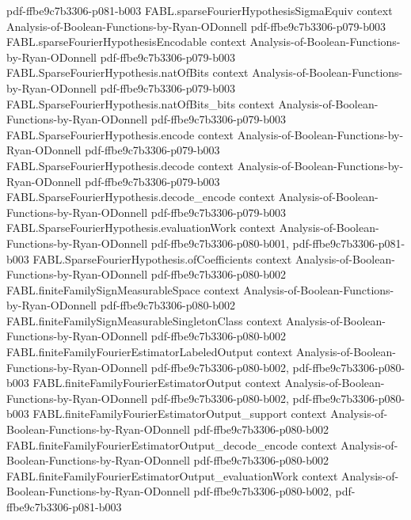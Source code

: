 \begin{theorem}
{    pdf-ffbe9c7b3306-p081-b003}
\proofstep
  {FABL.sparseFourierHypothesisSigmaEquiv}
  {context}
  {Analysis-of-Boolean-Functions-by-Ryan-ODonnell}
  {pdf-ffbe9c7b3306-p079-b003}
\proofstep
  {FABL.sparseFourierHypothesisEncodable}
  {context}
  {Analysis-of-Boolean-Functions-by-Ryan-ODonnell}
  {pdf-ffbe9c7b3306-p079-b003}
\proofstep
  {FABL.SparseFourierHypothesis.natOfBits}
  {context}
  {Analysis-of-Boolean-Functions-by-Ryan-ODonnell}
  {pdf-ffbe9c7b3306-p079-b003}
\proofstep
  {FABL.SparseFourierHypothesis.natOfBits_bits}
  {context}
  {Analysis-of-Boolean-Functions-by-Ryan-ODonnell}
  {pdf-ffbe9c7b3306-p079-b003}
\proofstep
  {FABL.SparseFourierHypothesis.encode}
  {context}
  {Analysis-of-Boolean-Functions-by-Ryan-ODonnell}
  {pdf-ffbe9c7b3306-p079-b003}
\proofstep
  {FABL.SparseFourierHypothesis.decode}
  {context}
  {Analysis-of-Boolean-Functions-by-Ryan-ODonnell}
  {pdf-ffbe9c7b3306-p079-b003}
\proofstep
  {FABL.SparseFourierHypothesis.decode_encode}
  {context}
  {Analysis-of-Boolean-Functions-by-Ryan-ODonnell}
  {pdf-ffbe9c7b3306-p079-b003}
\proofstep
  {FABL.SparseFourierHypothesis.evaluationWork}
  {context}
  {Analysis-of-Boolean-Functions-by-Ryan-ODonnell}
  {pdf-ffbe9c7b3306-p080-b001,
    pdf-ffbe9c7b3306-p081-b003}
\proofstep
  {FABL.SparseFourierHypothesis.ofCoefficients}
  {context}
  {Analysis-of-Boolean-Functions-by-Ryan-ODonnell}
  {pdf-ffbe9c7b3306-p080-b002}
\proofstep
  {FABL.finiteFamilySignMeasurableSpace}
  {context}
  {Analysis-of-Boolean-Functions-by-Ryan-ODonnell}
  {pdf-ffbe9c7b3306-p080-b002}
\proofstep
  {FABL.finiteFamilySignMeasurableSingletonClass}
  {context}
  {Analysis-of-Boolean-Functions-by-Ryan-ODonnell}
  {pdf-ffbe9c7b3306-p080-b002}
\proofstep
  {FABL.finiteFamilyFourierEstimatorLabeledOutput}
  {context}
  {Analysis-of-Boolean-Functions-by-Ryan-ODonnell}
  {pdf-ffbe9c7b3306-p080-b002,
    pdf-ffbe9c7b3306-p080-b003}
\proofstep
  {FABL.finiteFamilyFourierEstimatorOutput}
  {context}
  {Analysis-of-Boolean-Functions-by-Ryan-ODonnell}
  {pdf-ffbe9c7b3306-p080-b002,
    pdf-ffbe9c7b3306-p080-b003}
\proofstep
  {FABL.finiteFamilyFourierEstimatorOutput_support}
  {context}
  {Analysis-of-Boolean-Functions-by-Ryan-ODonnell}
  {pdf-ffbe9c7b3306-p080-b002}
\proofstep
  {FABL.finiteFamilyFourierEstimatorOutput_decode_encode}
  {context}
  {Analysis-of-Boolean-Functions-by-Ryan-ODonnell}
  {pdf-ffbe9c7b3306-p080-b002}
\proofstep
  {FABL.finiteFamilyFourierEstimatorOutput_evaluationWork}
  {context}
  {Analysis-of-Boolean-Functions-by-Ryan-ODonnell}
  {pdf-ffbe9c7b3306-p080-b002,
    pdf-ffbe9c7b3306-p081-b003}
\proofstep

\end{theorem}
